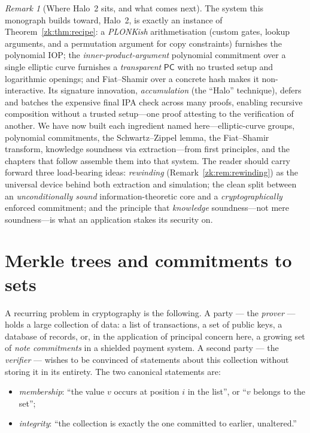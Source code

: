 \documentclass[11pt,a4paper]{article}
\theoremstyle{definition}
\theoremstyle{remark}
\newtheorem{remark}[theorem]{Remark}
\begin{document}
\begin{remark}[Where Halo~2 sits, and what comes next]\label{zk:rem:halo2}
The system this monograph builds toward, Halo~2, is exactly an instance of Theorem~\ref{zk:thm:recipe}: a \emph{PLONKish} arithmetisation (custom gates, lookup arguments, and a permutation argument for copy constraints) furnishes the polynomial IOP; the \emph{inner-product-argument} polynomial commitment over a single elliptic curve furnishes a \emph{transparent} \(\mathsf{PC}\) with no trusted setup and logarithmic openings; and Fiat--Shamir over a concrete hash makes it non-interactive. Its signature innovation, \emph{accumulation} (the ``Halo'' technique), defers and batches the expensive final IPA check across many proofs, enabling recursive composition without a trusted setup---one proof attesting to the verification of another. We have now built each ingredient named here---elliptic-curve groups, polynomial commitments, the Schwartz--Zippel lemma, the Fiat--Shamir transform, knowledge soundness via extraction---from first principles, and the chapters that follow assemble them into that system. The reader should carry forward three load-bearing ideas: \emph{rewinding} (Remark~\ref{zk:rem:rewinding}) as the universal device behind both extraction and simulation; the clean split between an \emph{unconditionally sound} information-theoretic core and a \emph{cryptographically} enforced commitment; and the principle that \emph{knowledge} soundness---not mere soundness---is what an application stakes its security on.
\end{remark}

\clearpage
\section{Merkle trees and commitments to sets}\label{sec:merkle}

A recurring problem in cryptography is the following. A party --- the \emph{prover} --- holds a large collection of data: a list of transactions, a set of public keys, a database of records, or, in the application of principal concern here, a growing set of \emph{note commitments} in a shielded payment system. A second party --- the \emph{verifier} --- wishes to be convinced of statements about this collection without storing it in its entirety. The two canonical statements are:

\begin{itemize}
\item \emph{membership}: ``the value \(v\) occurs at position \(i\) in the list'', or ``\(v\) belongs to the set'';
\item \emph{integrity}: ``the collection is exactly the one committed to earlier, unaltered.''
\end{itemize}
\end{document}
